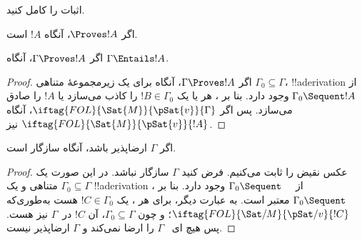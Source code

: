\documentclass[../../../include/open-logic-section]{subfiles}
\begin{document}
\begin{prob}
اثبات  را کامل کنید.
\end{prob}
\tagendprob

\begin{cor}
اگر $\Proves !A$، آنگاه $!A$  است.
\end{cor}

\begin{cor}
اگر $\Gamma \Proves !A$، آنگاه $\Gamma \Entails !A$.
\end{cor}

\begin{proof}
اگر $\Gamma \Proves !A$، آنگاه برای یک زیرمجموعهٔ متناهی
$\Gamma_0 \subseteq \Gamma$، !!a{derivation} از $\Gamma_0 \Sequent !A$
وجود دارد. بنا بر ، هر
یا یک $!B \in \Gamma_0$ را کاذب می‌سازد یا $!A$ را صادق می‌سازد. پس
اگر $\iftag{FOL}{\Sat{M}}{\pSat{v}}{\Gamma}$، آنگاه
$\iftag{FOL}{\Sat{M}}{\pSat{v}}{!A}$ نیز.
\end{proof}

\begin{cor}
اگر $\Gamma$ ارضاپذیر باشد، آنگاه سازگار است.
\end{cor}

\begin{proof}
عکس نقیض را ثابت می‌کنیم. فرض کنید $\Gamma$ سازگار نباشد. در این صورت
یک $\Gamma_0 \subseteq \Gamma$ متناهی و یک !!a{derivation} از
$\Gamma_0 \Sequent \quad$ وجود دارد. بنا بر
، $\Gamma_0 \Sequent \quad$ معتبر است. به
عبارت دیگر، برای هر
،
یک $!C \in \Gamma_0$ هست به‌طوری‌که
$\iftag{FOL}{\Sat/{M}}{\pSat/{v}}{!C}$؛ و چون $\Gamma_0
\subseteq \Gamma$، آن $!C$ در~$\Gamma$ نیز هست. پس هیچ
ای ~$\Gamma$ را ارضا نمی‌کند و
$\Gamma$ ارضاپذیر نیست.
\end{proof}
\end{document}
